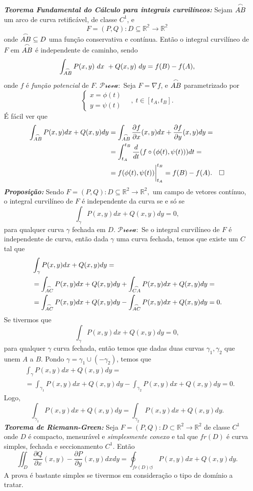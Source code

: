 \documentclass[
]{article}
\begin{document}
\textbf{\emph{Teorema Fundamental do Cálculo para integrais
curvilíneos:}} Sejam \(\overset{\LARGE \frown}{\small{AB}}\) um arco de
curva retificável, de classe \(C^1\), e
\[F=(P,Q):D\subseteq\mathbb{R^2}\rightarrow\mathbb{R^2}\]onde
\(\overset{\LARGE \frown}{\small{AB}}\subseteq D\) uma função
conservativa e contínua. Então o integral curvilíneo de \(F\) em
\(\overset{\LARGE \frown}{\small{AB}}\) é independente de caminho, sendo
\[\int_{\overset{\LARGE \frown}{\small{AB}}}P(x,y)\ dx\ +Q(x,y)\ dy=f(B)-f(A),\]onde
\(f\) é \emph{função potencial} de \(F\). \(\mathcal{Prova}:\) Seja
\(F=\nabla f\), e \(\overset{\LARGE \frown}{\small{AB}}\) parametrizado
por
\[\begin{cases}x=\phi(t)\\y=\psi(t)\end{cases}\quad,\ t\in[t_{A},t_{B}].\]
É fácil ver que
\begin{align}\int_{\overset{\LARGE \frown}{\small{AB}}}P(x,y)dx+Q(x,y)dy&=\int_{\overset{\LARGE \frown}{\small{AB}}} \frac{\partial f}{\partial x}(x,y) dx +\frac{\partial f}{\partial y}(x,y) dy=\\&= \int_{t_{A}}^{t_{B}} \frac{d}{dt}(f\circ(\phi(t),\psi(t)))dt=\\&=f(\phi(t),\psi(t))\bigg\rvert^{t_{B}}_{t_{A}}=f(B)-f(A).\quad\square\end{align}
\textbf{\emph{Proposição:}} Sendo
\(F=(P,Q):D\subseteq \mathbb{R}^2\rightarrow \mathbb{R}^2,\) um campo de
vetores contínuo, o integral curvilíneo de \(F\) é independente da curva
se e só se\[\int_{\gamma}P(x,y)dx+Q(x,y)dy=0,\]para qualquer curva
\(\gamma\) fechada em \(D\). \(\mathcal{Prova}:\) Se o integral
curvilíneo de \(F\) é independente de curva, então dada \(\gamma\) uma
curva fechada, temos que existe um \(C\) tal que
\begin{align}&\int_{\gamma}P(x,y)dx+Q(x,y)dy=\\&=\int_{\overset{\LARGE \frown}{\small{AC}}}P(x,y)dx+Q(x,y)dy+\int_{\overset{\LARGE \frown}{\small{CA}}}P(x,y)dx+Q(x,y)dy=\\&=\int_{\overset{\LARGE \frown}{\small{AC}}}P(x,y)dx+Q(x,y)dy -\int_{\overset{\LARGE \frown}{\small{AC}}}P(x,y)dx+Q(x,y)dy=0.\end{align}Se
tivermos que \[\int_{\gamma}P(x,y)dx+Q(x,y)dy=0,\]para qualquer
\(\gamma\) curva fechada, então temos que dadas duas curvas
\(\gamma_{1},\gamma_{2}\) que unem \(A\) a \(B\). Pondo
\(\gamma=\gamma_{1}\cup(-\gamma_{2})\), temos que
\begin{align}&\int_{\gamma}P(x,y)dx+Q(x,y)dy=\\&=\int_{\gamma_{1}}P(x,y)dx+Q(x,y)dy-\int_{\gamma_{2}}P(x,y)dx+Q(x,y)dy=0.\end{align}
Logo,
\[\int_{\gamma_{1}}P(x,y)dx+Q(x,y)dy=\int_{\gamma_{2}}P(x,y)dx+Q(x,y)dy.\]
\textbf{\emph{Teorema de Riemann-Green:}} Seja
\(F=(P,Q):D\subset \mathbb{R}^2\rightarrow \mathbb{R}^2\) de classe
\(C^1\) onde \(D\) é compacto, mensurável e \emph{simplesmente conexo} e
tal que \(fr(D)\) é curva simples, fechada e seccionamento \(C^1\).
Então
\[\iint_{D} \frac{\partial{Q}}{\partial x}(x,y)-\frac{\partial{P}}{\partial y}(x,y)dxdy=\oint_{fr(D)\circlearrowleft}P(x,y)dx+Q(x,y)dy.\]
A prova é bastante simples se tivermos em consideração o tipo de domínio
a tratar.
\end{document}
